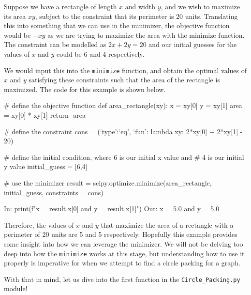 \begin{flushleft}
Suppose we have a rectangle of length $x$ and width $y$, and we wish to maximize its area $xy$, subject to the constraint that its perimeter is 20 units. Translating this into something that we can use in the minimizer, the objective function would be $-xy$ as we are trying to maximize the area with the minimize function. The constraint can be modelled as $2x+2y = 20$ and our initial guesses for the values of $x$ and $y$ could be 6 and 4 respectively. 
\end{flushleft}

\begin{flushleft}
We would input this into the \texttt{minimize} function, and obtain the optimal values of $x$ and $y$ satisfying these constraints such that the area of the rectangle is maximized. The code for this example is shown below.
\end{flushleft} 

\begin{code}
    # define the objective function
    def area_rectangle(xy):
        x = xy[0]
        y = xy[1]
        area = xy[0] * xy[1]
        return -area
    
    # define the constraint
    cons = ({`type':`eq', `fun': lambda xy: 2*xy[0] + 2*xy[1] - 20})
    
    # define the initial condition, where 6 is our initial x value and 
    # 4 is our initial y value
    initial_guess = [6,4]
    
    # use the minimizer
    result = scipy.optimize.minimize(area_rectangle, initial_guess, constraints = cons)
\end{code}

\begin{code}
    In: print(f"x = {result.x[0]} and y = {result.x[1]}")
    Out: x = 5.0 and y = 5.0    
\end{code}

\begin{flushleft}
Therefore, the values of $x$ and $y$ that maximize the area of a rectangle with a perimeter of 20 units are 5 and 5 respectively. Hopefully this example provides some insight into how we can leverage the minimizer. We will not be delving too deep into how the \texttt{minimize} works at this stage, but understanding how to use it properly is imperative for when we attempt to find a circle packing for a graph.
\end{flushleft}

\begin{flushleft}
With that in mind, let us dive into the first function in the \texttt{Circle\_Packing.py} module!
\end{flushleft}

